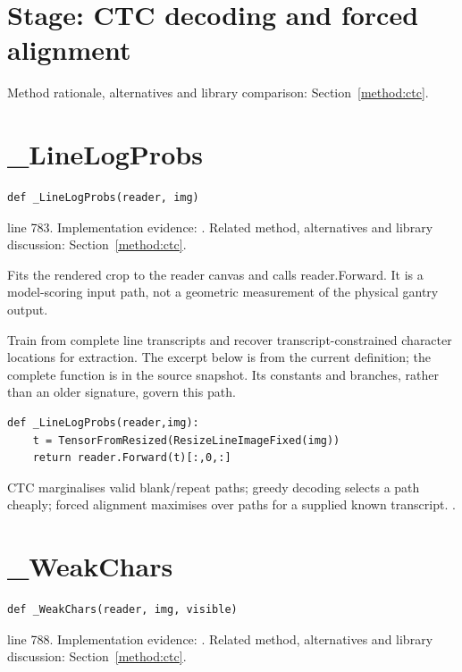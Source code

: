 \section*{Stage: CTC decoding and forced alignment}
Method rationale, alternatives and library comparison: Section~\ref{method:ctc}.
\section{\_LineLogProbs}\label{fn:synthesise:-LineLogProbs}
\begin{lstlisting}[style=sig]
def _LineLogProbs(reader, img)
\end{lstlisting}
 line 783. Implementation evidence: \cite{code2026}. Related method, alternatives and library discussion: Section~\ref{method:ctc}.


Fits the rendered crop to the reader canvas and calls reader.Forward. It is a model-scoring input path, not a geometric measurement of the physical gantry output.


Train from complete line transcripts and recover transcript-constrained character locations for extraction. The excerpt below is from the current definition; the complete function is in the source snapshot. Its constants and branches, rather than an older signature, govern this path.


\begin{lstlisting}[style=plain]
def _LineLogProbs(reader,img):
    t = TensorFromResized(ResizeLineImageFixed(img))
    return reader.Forward(t)[:,0,:]
\end{lstlisting}
CTC marginalises valid blank/repeat paths; greedy decoding selects a path cheaply; forced alignment maximises over paths for a supplied known transcript. \cite{graves2006,ctcdistill,torchctc}.


\section{\_WeakChars}\label{fn:synthesise:-WeakChars}
\begin{lstlisting}[style=sig]
def _WeakChars(reader, img, visible)
\end{lstlisting}
 line 788. Implementation evidence: \cite{code2026}. Related method, alternatives and library discussion: Section~\ref{method:ctc}.


